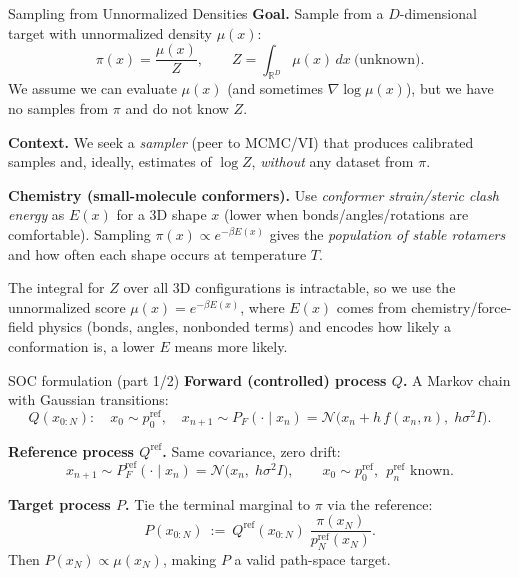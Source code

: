 \documentclass[aspectratio=169,xcolor=dvipsnames]{beamer}
\begin{document}
\begin{frame}[t]{Sampling from Unnormalized Densities}
\footnotesize
\textbf{Goal.} Sample from a $D$-dimensional target with unnormalized density $\mu(x)$:
\[
\pi(x)=\frac{\mu(x)}{Z},\qquad Z=\int_{\mathbb R^D}\mu(x)\,dx\ \text{(unknown)}.
\]
We assume we can evaluate $\mu(x)$ (and sometimes $\nabla \log \mu(x)$), but we have no samples from $\pi$ and do not know $Z$.

\medskip
\textbf{Context.} We seek a \emph{sampler} (peer to MCMC/VI) that produces calibrated samples and, ideally, estimates of $\log Z$, \emph{without} any dataset from $\pi$.

\vspace{0.2cm}


\textbf{Chemistry (small-molecule conformers).} Use \emph{conformer strain/steric clash energy} as $E(x)$ for a 3D shape $x$ (lower when bonds/angles/rotations are comfortable). Sampling $\pi(x)\propto e^{-\beta E(x)}$ gives the \emph{population of stable rotamers} and how often each shape occurs at temperature $T$.

\vspace{0.2cm}

The integral for $Z$ over all 3D configurations is intractable, so we use the unnormalized score $\mu(x)=e^{-\beta E(x)}$, where $E(x)$ comes from chemistry/force-field physics (bonds, angles, nonbonded terms) and encodes how likely a conformation is, a lower $E$ means more likely.









\end{frame}



\begin{frame}[t]{SOC formulation (part 1/2)}
\footnotesize
\textbf{Forward (controlled) process $Q$.} A Markov chain with Gaussian transitions:
\[
Q(x_{0:N}):\quad x_0\sim p_0^{\text{ref}},\quad x_{n+1}\sim P_F(\cdot\mid x_n)=\mathcal N\!\big(x_n + h\,f(x_n,n),\; h\sigma^2 I\big).
\]

\textbf{Reference process $Q^{\text{ref}}$.} Same covariance, zero drift:
\[
x_{n+1}\sim P_F^{\text{ref}}(\cdot\mid x_n)=\mathcal N\!\big(x_n,\; h\sigma^2 I\big),\qquad x_0\sim p_0^{\text{ref}},\ \ p_n^{\text{ref}}\text{ known.}
\]

\textbf{Target process $P$.} Tie the terminal marginal to $\pi$ via the reference:
\[
P(x_{0:N})\ :=\ Q^{\text{ref}}(x_{0:N})\;\frac{\pi(x_N)}{p_N^{\text{ref}}(x_N)}.
\]
Then $P(x_N)\propto \mu(x_N)$, making $P$ a valid path-space target.
\end{frame}
\end{document}
